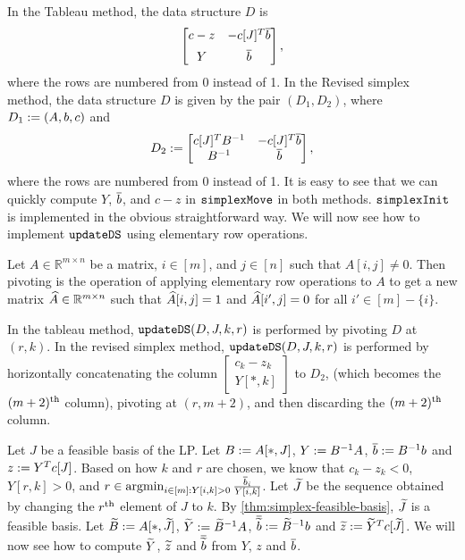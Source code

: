 In the Tableau method, the data structure $D$ is
\[ \begin{bmatrix} c - z & -c[J]^T\overline{b} \\[0.5em] Y & \overline{b} \end{bmatrix}, \]
where the rows are numbered from 0 instead of 1.
In the Revised simplex method, the data structure $D$ is given by
the pair $(D_1, D_2)$, where $D_1 := (A, b, c)$ and
\[ D_2 := \begin{bmatrix} c[J]^TB^{-1} & -c[J]^T\overline{b} \\ B^{-1} & \overline{b} \end{bmatrix}, \]
where the rows are numbered from 0 instead of 1.
It is easy to see that we can quickly compute $Y$, $\overline{b}$, and $c-z$
in $\operatorname{\mathtt{simplexMove}}$ in both methods.
$\operatorname{\mathtt{simplexInit}}$ is implemented in the obvious straightforward way.
We will now see how to implement $\operatorname{\mathtt{updateDS}}$ using elementary row operations.

\begin{definition}[pivoting]
Let $A \in \mathbb{R}^{m \times n}$ be a matrix, $i \in [m]$, and $j \in [n]$
such that $A[i, j] \neq 0$. Then pivoting is the operation of applying
elementary row operations to $A$ to get a new matrix $\widehat{A} \in \mathbb{R}^{m \times n}$
such that $\widehat{A}[i, j] = 1$ and $\widehat{A}[i', j] = 0$ for all $i' \in [m] - \{i\}$.
\end{definition}

In the tableau method, $\operatorname{\mathtt{updateDS}}(D, J, k, r)$ is performed by pivoting $D$ at $(r, k)$.
In the revised simplex method, $\operatorname{\mathtt{updateDS}}(D, J, k, r)$ is performed by
horizontally concatenating the column
$\begin{bmatrix}c_k - z_k \\ Y[*, k] \end{bmatrix}$ to $D_2$,
(which becomes the $(m+2)^{\textrm{th}}$ column), pivoting at $(r, m+2)$,
and then discarding the $(m+2)^{\textrm{th}}$ column.

Let $J$ be a feasible basis of the LP.
Let $B := A[*,J]$, $Y := B^{-1}A$, $\overline{b} := B^{-1}b$ and $z := Y^Tc[J]$.
Based on how $k$ and $r$ are chosen, we know that $c_k - z_k < 0$,
$Y[r,k] > 0$, and $r \in \operatorname*{argmin}_{i \in [m]: Y[i,k] > 0} \frac{\overline{b}_i}{Y[i,k]}$.
Let $\widetilde{J}$ be the sequence obtained by changing the $r^{\textrm{th}}$ element of $J$ to $k$.
By \cref{thm:simplex-feasible-basis}, $\widetilde{J}$ is a feasible basis.
Let $\widetilde{B} := A[*,\widetilde{J}]$, $\widetilde{Y} := \widetilde{B}^{-1}A$, $\overline{\widetilde{b}} := \widetilde{B}^{-1}b$
and $\widetilde{z} := \widetilde{Y}^Tc[\widetilde{J}]$.
We will now see how to compute $\widetilde{Y}$, $\widetilde{z}$ and $\overline{\widetilde{b}}$
from $Y$, $z$ and $\overline{b}$.

